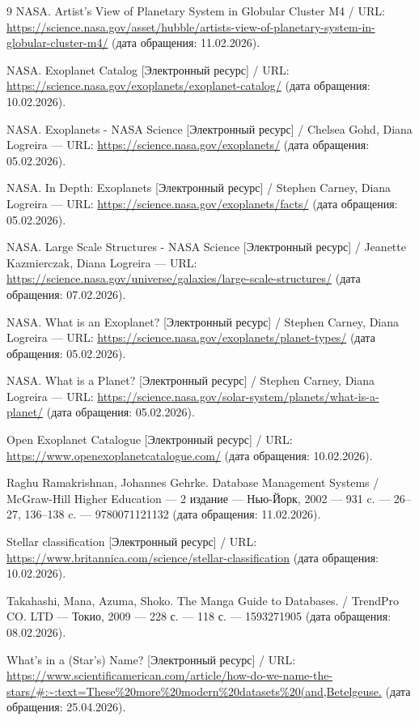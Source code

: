 \documentclass[14pt,a4paper]{extarticle}
\begin{document}
\begin{thebibliography}{9}
		 NASA. Artist’s View of Planetary System in Globular Cluster M4 / URL: \url{https://science.nasa.gov/asset/hubble/artists-view-of-planetary-system-in-globular-cluster-m4/} (дата обращения: 11.02.2026).
		
		 NASA. Exoplanet Catalog [Электронный ресурс] / URL: \url{https://science.nasa.gov/exoplanets/exoplanet-catalog/} (дата обращения: 10.02.2026).
		
		 NASA. Exoplanets - NASA Science [Электронный ресурс] / Chelsea Gohd, Diana Logreira --- URL: \url{https://science.nasa.gov/exoplanets/} (дата обращения: 05.02.2026).
		
		 NASA. In Depth: Exoplanets [Электронный ресурс] / Stephen Carney, Diana Logreira --- URL: \url{https://science.nasa.gov/exoplanets/facts/} (дата обращения: 05.02.2026).
		
		 NASA. Large Scale Structures - NASA Science [Электронный ресурс] / Jeanette Kazmierczak, Diana Logreira --- URL: \url{https://science.nasa.gov/universe/galaxies/large-scale-structures/} (дата обращения: 07.02.2026).
		
		 NASA. What is an Exoplanet? [Электронный ресурс] / Stephen Carney, Diana Logreira --- URL: \url{https://science.nasa.gov/exoplanets/planet-types/} (дата обращения: 05.02.2026).
		
		 NASA. What is a Planet? [Электронный ресурс] / Stephen Carney, Diana Logreira --- URL: \url{https://science.nasa.gov/solar-system/planets/what-is-a-planet/} (дата обращения: 05.02.2026).
		
		 Open Exoplanet Catalogue [Электронный ресурс] / URL: \url{https://www.openexoplanetcatalogue.com/} (дата обращения: 10.02.2026).

         Raghu Ramakrishnan, Johannes Gehrke. Database Management Systems / McGraw-Hill Higher Education --- 2 издание --- Нью-Йорк, 2002 --- 931 c. --- 26--27, 136--138 c. --- 9780071121132 (дата обращения: 11.02.2026).
		
		 Stellar classification [Электронный ресурс] / URL: \url{https://www.britannica.com/science/stellar-classification} (дата обращения: 10.02.2026).
		
		 Takahashi, Mana, Azuma, Shoko. The Manga Guide to Databases. / TrendPro CO. LTD --- Токио, 2009 --- 228 с. --- 118 с. --- 1593271905 (дата обращения: 08.02.2026).
		
		 What’s in a (Star’s) Name? [Электронный ресурс] / URL: \url{https://www.scientificamerican.com/article/how-do-we-name-the-stars/#:~:text=These%20more%20modern%20datasets%20(and,Betelgeuse.} (дата обращения: 25.04.2026).
	\end{thebibliography}
\end{document}
